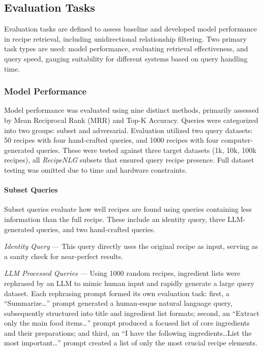 \documentclass[11pt]{article}
\begin{document}
\subsection{Evaluation Tasks}
Evaluation tasks are defined to assess baseline and developed model performance
in recipe retrieval, including unidirectional relationship filtering.
Two primary task types are used: model performance, evaluating retrieval
effectiveness, and query speed, gauging suitability for different systems based
on query handling time.

\subsubsection{Model Performance}\label{sec:modelperfomance}
Model performance was evaluated using nine distinct methods, primarily assessed
by Mean Reciprocal Rank (MRR) and Top-K Accuracy.
Queries were categorized into two groups: subset and adversarial.
Evaluation utilized two query datasets: 50 recipes with four hand-crafted
queries, and 1000 recipes with four computer-generated queries.
These were tested against three target datasets (1k, 10k, 100k recipes), all
\emph{RecipeNLG} subsets that ensured query recipe presence.
Full dataset testing was omitted due to time and hardware constraints.
\paragraph{Subset Queries}
Subset queries evaluate how well recipes are found using queries containing less information than the full recipe.
These include an identity query, three LLM-generated queries, and two hand-crafted queries.

\emph{Identity Query} --- This query directly uses the original recipe as input, serving as a sanity check for near-perfect results.

\emph{LLM Processed Queries} --- Using 1000 random recipes, ingredient lists
were rephrased by an LLM to mimic human input and rapidly generate a large query
dataset.
Each rephrasing prompt formed its own evaluation task: first, a
``Summarize\ldots'' prompt generated a human-esque natural language query,
subsequently structured into title and ingredient list formats; second, an
``Extract only the main food items\ldots'' prompt produced a focused list of
core ingredients and their preparations; and third, an ``I have the following
ingredients\ldots List the most important\ldots'' prompt created a list of only
the most crucial recipe elements.  
\end{document}
